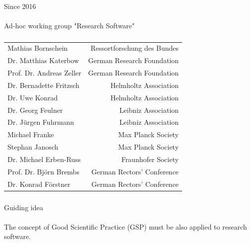 \documentclass{beamer}
\begin{document}
\begin{frame}
  \frametitle{}
    \begin{block}{}
      \begin{center}
        Since 2016\\ \ \\
        Ad-hoc working group "Research Software"
      \end{center}
    \end{block}
\end{frame}


\begin{frame}
  \frametitle{}
    \begin{block}{}  
      \begin{center}
        {\large
      \begin{tabular}{lr}
        Mathias Bornschein & Ressortforschung des Bundes\\
        Dr. Matthias Katerbow & German Research Foundation \\
        Prof. Dr. Andreas Zeller & German Research Foundation\\
        Dr. Bernadette Fritzsch & Helmholtz Association \\
        Dr. Uwe Konrad & Helmholtz Association\\
        Dr. Georg Feulner & Leibniz Association\\
        Dr. Jürgen Fuhrmann & Leibniz Association\\
        Michael Franke & Max Planck Society \\
        Stephan Janosch & Max Planck Society \\
        Dr. Michael Erben-Russ & Fraunhofer Society \\
        Prof. Dr. Björn Brembs & German Rectors' Conference\\
        Dr. Konrad Förstner & German Rectors' Conference\\
      \end{tabular}}
    \end{center}
    \end{block}
\end{frame}

\begin{frame}
  \frametitle{}
  \begin{block}{}
    \begin{center}
      Guiding idea\\\ \\
    The concept of Good Scientific Practice (GSP) must be also applied
    to research software.
    \end{center}
  \end{block}
\end{frame}
\end{document}
